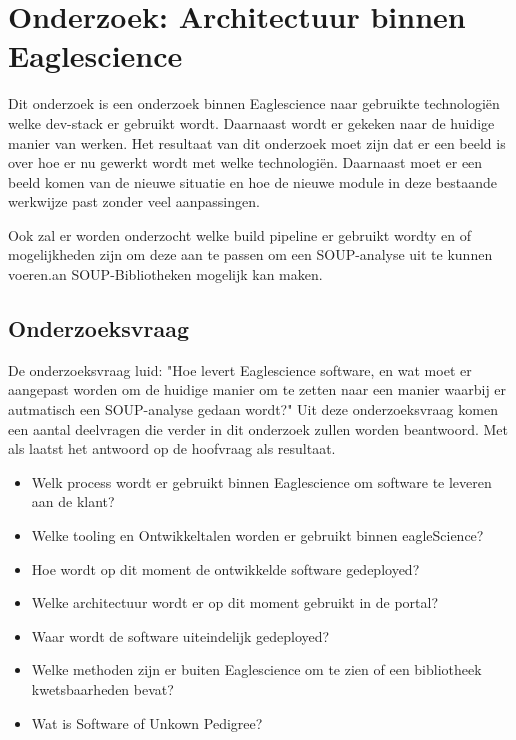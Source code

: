 
\chapter{Onderzoek: Architectuur binnen Eaglescience}\label{ch:onderzoek:-architectuur-binnen-eaglescience} %
Dit onderzoek is een onderzoek binnen Eaglescience naar gebruikte technologiën welke dev-stack er gebruikt wordt.
Daarnaast wordt er gekeken naar de huidige manier van werken.
Het resultaat van dit onderzoek moet zijn dat er een beeld is over hoe er nu gewerkt wordt met welke technologiën.
Daarnaast moet er een beeld komen van de nieuwe situatie en hoe de nieuwe module in deze bestaande werkwijze past zonder veel aanpassingen.

Ook zal er worden onderzocht welke build pipeline er gebruikt wordty en of mogelijkheden zijn om deze aan te passen om een SOUP-analyse uit te kunnen voeren.an SOUP-Bibliotheken mogelijk kan maken.
\section{Onderzoeksvraag}\label{sec:onderzoeksvraag}
De onderzoeksvraag luid: "Hoe levert Eaglescience software, en wat moet er aangepast worden om de huidige manier om te zetten naar een manier waarbij er autmatisch een SOUP-analyse gedaan wordt?" Uit deze onderzoeksvraag komen een aantal deelvragen die verder in dit onderzoek zullen worden beantwoord.
Met als laatst het antwoord op de hoofvraag als resultaat.

\begin{itemize}
  \item Welk process wordt er gebruikt binnen Eaglescience om software te leveren aan de klant?
  \item Welke tooling en Ontwikkeltalen worden er gebruikt binnen eagleScience?
  \item Hoe wordt op dit moment de ontwikkelde software gedeployed?
  \item Welke architectuur wordt er op dit moment gebruikt in de portal?
  \item Waar wordt de software uiteindelijk gedeployed?
  \item Welke methoden zijn er buiten Eaglescience om te zien of een bibliotheek kwetsbaarheden bevat?
  \item Wat is Software of Unkown Pedigree?
\end{itemize}

